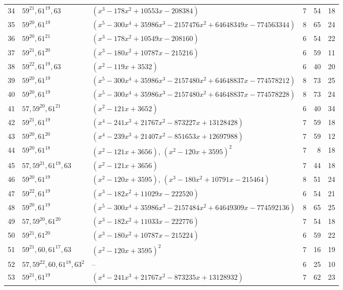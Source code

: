 \documentclass[11pt]{article}
\theoremstyle{definition}
\begin{document}
{\begin{longtable}{rlp{6.2cm}rrr}
34 & $59^{21}, 61^{19}, 63$ & $(x^{3} - 178x^{2} + 10553x - 208384)$ & 7 & 54 & 18 \\
35 & $59^{20}, 61^{19}$ & $(x^{5} - 300x^{4} + 35986x^{3} - 2157476x^{2} + 64648349x - 774563344)$ & 8 & 65 & 24 \\
36 & $59^{20}, 61^{21}$ & $(x^{3} - 178x^{2} + 10549x - 208160)$ & 6 & 54 & 22 \\
37 & $59^{21}, 61^{20}$ & $(x^{3} - 180x^{2} + 10787x - 215216)$ & 6 & 59 & 11 \\
38 & $59^{22}, 61^{19}, 63$ & $(x^{2} - 119x + 3532)$ & 6 & 40 & 20 \\
39 & $59^{20}, 61^{19}$ & $(x^{5} - 300x^{4} + 35986x^{3} - 2157480x^{2} + 64648837x - 774578212)$ & 8 & 73 & 25 \\
40 & $59^{20}, 61^{19}$ & $(x^{5} - 300x^{4} + 35986x^{3} - 2157480x^{2} + 64648837x - 774578228)$ & 8 & 73 & 24 \\
41 & $57, 59^{20}, 61^{21}$ & $(x^{2} - 121x + 3652)$ & 6 & 40 & 34 \\
42 & $59^{21}, 61^{19}$ & $(x^{4} - 241x^{3} + 21767x^{2} - 873227x + 13128428)$ & 7 & 59 & 18 \\
43 & $59^{20}, 61^{20}$ & $(x^{4} - 239x^{3} + 21407x^{2} - 851653x + 12697988)$ & 7 & 59 & 12 \\
44 & $59^{20}, 61^{18}$ & $(x^{2} - 121x + 3656)$, $(x^{2} - 120x + 3595)^{2}$ & 7 & 8 & 18 \\
45 & $57, 59^{21}, 61^{19}, 63$ & $(x^{2} - 121x + 3656)$ & 7 & 44 & 18 \\
46 & $59^{20}, 61^{19}$ & $(x^{2} - 120x + 3595)$, $(x^{3} - 180x^{2} + 10791x - 215464)$ & 8 & 51 & 24 \\
47 & $59^{22}, 61^{19}$ & $(x^{3} - 182x^{2} + 11029x - 222520)$ & 6 & 54 & 21 \\
48 & $59^{20}, 61^{19}$ & $(x^{5} - 300x^{4} + 35986x^{3} - 2157484x^{2} + 64649309x - 774592136)$ & 8 & 65 & 25 \\
49 & $57, 59^{20}, 61^{20}$ & $(x^{3} - 182x^{2} + 11033x - 222776)$ & 7 & 54 & 18 \\
50 & $59^{21}, 61^{20}$ & $(x^{3} - 180x^{2} + 10787x - 215224)$ & 6 & 59 & 22 \\
51 & $59^{21}, 60, 61^{17}, 63$ & $(x^{2} - 120x + 3595)^{2}$ & 7 & 16 & 19 \\
52 & $57, 59^{22}, 60, 61^{18}, 63^{2}$ & -- & 6 & 25 & 10 \\
53 & $59^{21}, 61^{19}$ & $(x^{4} - 241x^{3} + 21767x^{2} - 873235x + 13128932)$ & 7 & 62 & 23 \\

\end{longtable}}
\end{document}
